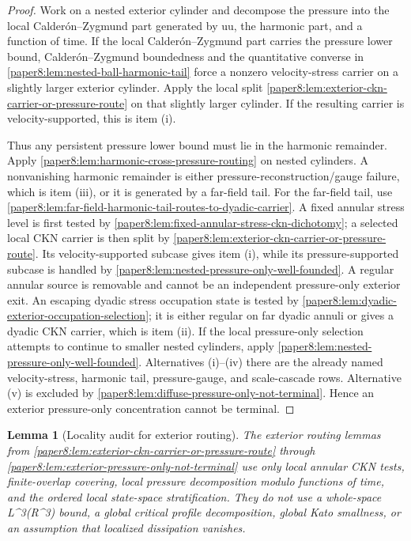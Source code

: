 \documentclass[11pt]{amsart}
\def\({}%
\def\){}%
\def\mathbb#1{#1}%
\theoremstyle{plain}
\newtheorem{lemma}[lemma]{Lemma}
\theoremstyle{definition}
\theoremstyle{remark}
\begin{document}
\begin{proof}
Work on a nested exterior cylinder and decompose the pressure into the local
Calder\'on--Zygmund part generated by \(\zeta u\otimes u\), the harmonic part,
and a function of time.  If the local Calder\'on--Zygmund part carries the
pressure lower bound, Calder\'on--Zygmund boundedness and the quantitative
converse in \cref{paper8:lem:nested-ball-harmonic-tail} force a nonzero
velocity-stress carrier on a slightly larger exterior cylinder.  Apply the
local split \cref{paper8:lem:exterior-ckn-carrier-or-pressure-route} on that
slightly larger cylinder.  If the resulting carrier is velocity-supported, this
is item \textup{(i)}.
\par
Thus any persistent pressure lower bound must lie in the harmonic remainder.
Apply \cref{paper8:lem:harmonic-cross-pressure-routing} on nested cylinders.
A nonvanishing harmonic remainder is either pressure-reconstruction/gauge
failure, which is item \textup{(iii)}, or it is generated by a far-field tail.
For the far-field tail, use
\cref{paper8:lem:far-field-harmonic-tail-routes-to-dyadic-carrier}.  A fixed
annular stress level is first tested by
\cref{paper8:lem:fixed-annular-stress-ckn-dichotomy}; a selected local CKN
carrier is then split by
\cref{paper8:lem:exterior-ckn-carrier-or-pressure-route}.  Its
velocity-supported subcase gives item \textup{(i)}, while its
pressure-supported subcase is handled by
\cref{paper8:lem:nested-pressure-only-well-founded}.  A regular annular source
is removable and cannot be an independent pressure-only exterior exit.  An
escaping dyadic stress occupation state is tested by
\cref{paper8:lem:dyadic-exterior-occupation-selection}; it is either regular on
far dyadic annuli or gives a dyadic CKN carrier, which is item \textup{(ii)}.
If the local pressure-only selection attempts to continue to smaller nested
cylinders, apply \cref{paper8:lem:nested-pressure-only-well-founded}.
Alternatives \textup{(i)}--\textup{(iv)} there are the already named
velocity-stress, harmonic tail, pressure-gauge, and scale-cascade rows.
Alternative \textup{(v)} is excluded by
\cref{paper8:lem:diffuse-pressure-only-not-terminal}.  Hence an exterior
pressure-only concentration cannot be terminal.
\end{proof}

\begin{lemma}[Locality audit for exterior routing]
\label{paper8:lem:exterior-routing-locality-audit}
The exterior routing lemmas from
\cref{paper8:lem:exterior-ckn-carrier-or-pressure-route} through
\cref{paper8:lem:exterior-pressure-only-not-terminal} use only local annular
CKN tests, finite-overlap covering, local pressure decomposition modulo
functions of time, and the ordered local state-space stratification.  They do
not use a whole-space \(L^3(\mathbb R^3)\) bound, a global critical profile
decomposition, global Kato smallness, or an assumption that localized
dissipation vanishes.
\end{lemma}
\end{document}
